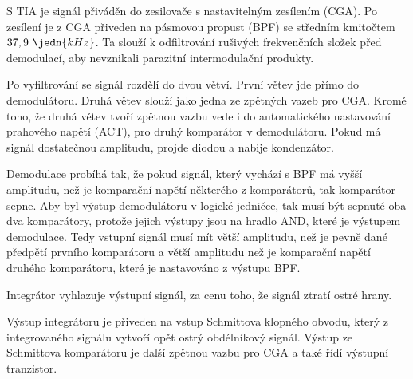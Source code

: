 S TIA je signál přiváděn do zesilovače s nastavitelným zesílením (CGA). Po zesílení je z CGA přiveden na pásmovou propust (BPF) se středním kmitočtem $37,9~\jedn{kHz}$. Ta slouží k odfiltrování rušivých frekvenčních složek před demodulací, aby nevznikali parazitní intermodulační produkty.

Po vyfiltrování se signál rozdělí do dvou větví. První větev jde přímo do demodulátoru. Druhá větev slouží jako jedna ze zpětných vazeb pro CGA. Kromě toho, že druhá větev tvoří zpětnou vazbu vede i do automatického nastavování prahového napětí (ACT), pro druhý komparátor v demodulátoru. Pokud má signál dostatečnou amplitudu, projde diodou a nabije kondenzátor.

Demodulace probíhá tak, že pokud signál, který vychází s BPF má vyšší amplitudu, než je komparační napětí některého z komparátorů, tak komparátor sepne. Aby byl výstup demodulátoru v logické jedničce, tak musí být sepnuté oba dva komparátory, protože jejich výstupy jsou na hradlo AND, které je výstupem demodulace. Tedy vstupní signál musí mít větší amplitudu, než je pevně dané předpětí prvního komparátoru a větší amplitudu než je komparační napětí druhého komparátoru, které je nastavováno z výstupu BPF.

Integrátor vyhlazuje výstupní signál, za cenu toho, že signál ztratí ostré hrany.

Výstup integrátoru je přiveden na vstup Schmittova klopného obvodu, který z integrovaného signálu vytvoří opět ostrý obdélníkový signál. Výstup ze Schmittova komparátoru je další zpětnou vazbu pro CGA a také řídí výstupní tranzistor.
